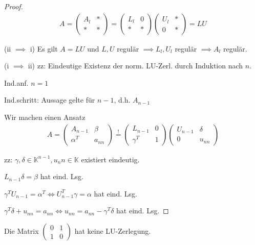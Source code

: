 \begin{proof}
	\begin{align*}
		A = \left(\begin{matrix}
			A_l & *\\
			* & *
		\end{matrix}\right) = \left(\begin{matrix}
			L_l & 0\\
			* & *
		\end{matrix}\right) \left(\begin{matrix}
		U_l & *\\
		0 & *
		\end{matrix}\right) = LU
	\end{align*}
	
	(ii $\implies$ i) Es gilt $A=LU$ und $L, U$ regulär $\implies L_l, U_l$ regulär $\implies A_l$ regulär.
	
	(i $\implies$ ii) zz: Eindeutige Existenz der norm. LU-Zerl. durch Induktion nach $n$.
	
	Ind.anf. $n=1$ \checkmark
	
	Ind.schritt: Aussage gelte für $n-1$, d.h. $A_{n-1}$
	
	Wir machen einen Ansatz
	\begin{align*}
		A = \left(\begin{matrix}
			A_{n-1} & \beta\\
			\alpha^T & a_{nn}
		\end{matrix}\right) \overset{!}{=} \left(\begin{matrix}
		L_{n-1} & 0\\
		\gamma^T & 1
		\end{matrix}\right) \left(\begin{matrix}
		U_{n-1} & \delta\\
		0 & u_{nn}
		\end{matrix}\right)
	\end{align*}
	
	zz: $\gamma, \delta \in \mathbb{K}^{n-1}, u_nn\in \mathbb{K}$ existiert eindeutig.
	
	$L_{n-1}\delta = \beta$ hat eind. Lsg.
	
	$\gamma^T U_{n-1} = \alpha^T \iff U_{n-1}^T \gamma = \alpha$ hat eind. Lsg.
	
	$\gamma^T\delta + u_{nn} = a_{nn} \iff u_{nn} = a_{nn} - \gamma^T \delta$ hat eind. Lsg.
\end{proof}

\begin{example}
	Die Matrix $\left(\begin{matrix}
		0 & 1\\
		1 & 0
	\end{matrix}\right)$ hat keine LU-Zerlegung.
\end{example}

